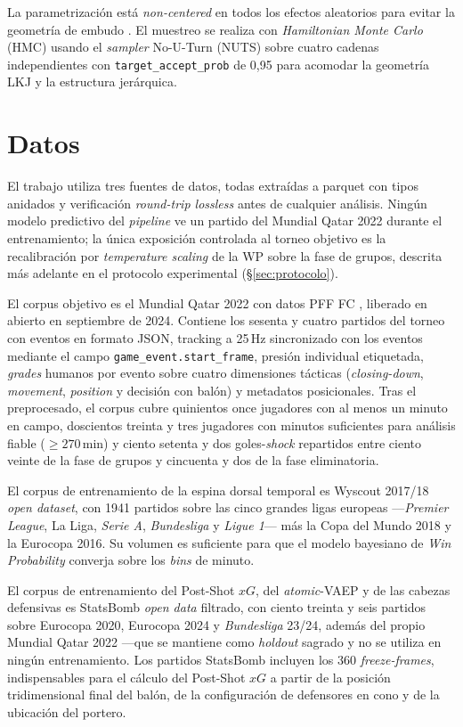 La parametrización está \textit{non-centered} en todos los efectos
aleatorios para evitar la geometría de embudo
\parencite{BetancourtGirolami2015}. El muestreo se realiza con \textit{Hamiltonian Monte Carlo}
(HMC) usando el \textit{sampler} No-U-Turn (NUTS) sobre cuatro
cadenas independientes con \texttt{target\_accept\_prob} de 0{,}95
para acomodar la geometría LKJ y la estructura jerárquica.


\section{Datos}
\label{sec:datos}

El trabajo utiliza tres fuentes de datos, todas extraídas a parquet
con tipos anidados y verificación \textit{round-trip lossless} antes
de cualquier análisis. Ningún modelo predictivo del \textit{pipeline}
ve un partido del Mundial Qatar 2022 durante el entrenamiento; la
única exposición controlada al torneo objetivo es la recalibración
por \textit{temperature scaling} de la WP sobre la fase de grupos,
descrita más adelante en el protocolo experimental
(§\ref{sec:protocolo}).

El corpus objetivo es el Mundial Qatar 2022 con datos PFF FC
\parencite{PFFFC2024Release}, liberado en abierto en septiembre de
2024. Contiene los sesenta y cuatro partidos del torneo con eventos
en formato JSON, tracking a 25\,Hz sincronizado con los eventos
mediante el campo \texttt{game\_event.start\_frame}, presión
individual etiquetada, \textit{grades} humanos por evento sobre
cuatro dimensiones tácticas (\textit{closing-down}, \textit{movement},
\textit{position} y decisión con balón) y metadatos posicionales.
Tras el preprocesado, el corpus cubre quinientos once jugadores con
al menos un minuto en campo, doscientos treinta y tres jugadores con
minutos suficientes para análisis fiable ($\geq 270$\,min) y ciento
setenta y dos goles-\textit{shock} repartidos entre ciento veinte de
la fase de grupos y cincuenta y dos de la fase eliminatoria.

El corpus de entrenamiento de la espina dorsal temporal es Wyscout
2017/18 \textit{open dataset}, con 1941 partidos sobre las cinco
grandes ligas europeas ---\textit{Premier League}, La Liga,
\textit{Serie A}, \textit{Bundesliga} y \textit{Ligue 1}--- más la
Copa del Mundo 2018 y la Eurocopa 2016. Su volumen es suficiente para
que el modelo bayesiano de \textit{Win Probability} converja sobre
los \textit{bins} de minuto.

El corpus de entrenamiento del Post-Shot $xG$, del \textit{atomic}-VAEP
y de las cabezas defensivas es StatsBomb \textit{open data} filtrado,
con ciento treinta y seis partidos sobre Eurocopa 2020, Eurocopa 2024
y \textit{Bundesliga} 23/24, además del propio Mundial Qatar 2022
---que se mantiene como \textit{holdout} sagrado y no se utiliza en
ningún entrenamiento. Los partidos StatsBomb incluyen los 360
\textit{freeze-frames}, indispensables para el cálculo del Post-Shot
$xG$ a partir de la posición tridimensional final del balón, de la
configuración de defensores en cono y de la ubicación del portero.

